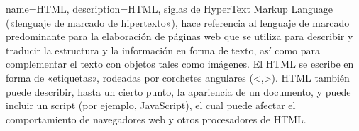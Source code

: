 



{name=HTML,
description={HTML, siglas de HyperText Markup Language («lenguaje de marcado de hipertexto»), hace referencia al lenguaje de marcado predominante para la elaboración de páginas web que se utiliza para describir y traducir la estructura y la información en forma de texto, así como para complementar el texto con objetos tales como imágenes. El HTML se escribe en forma de «etiquetas», rodeadas por corchetes angulares (<,>). HTML también puede describir, hasta un cierto punto, la apariencia de un documento, y puede incluir un script (por ejemplo, JavaScript), el cual puede afectar el comportamiento de navegadores web y otros procesadores de HTML.}
}


